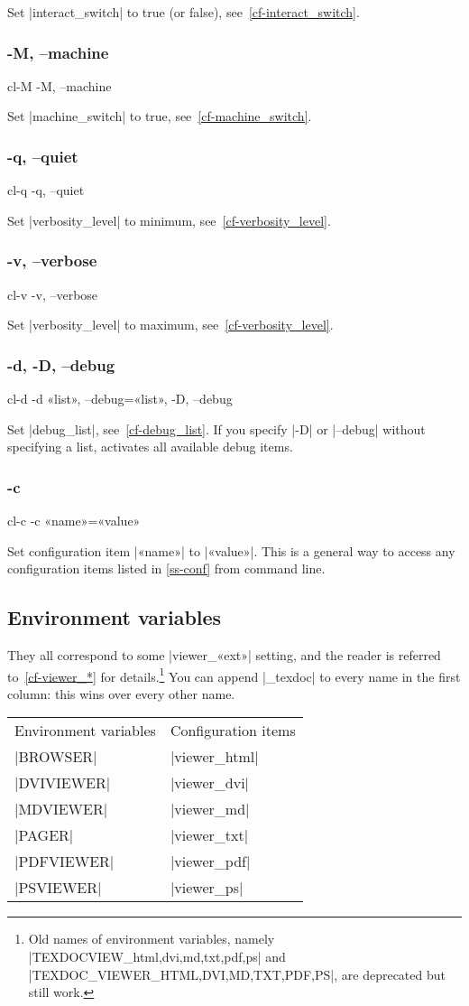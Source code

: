\documentclass[a4paper,oneside]{scrartcl}
\newif\ifframed
\newenvironment{cmdsubsub}[2]
  {\framedfalse \commandes\subsubsection{#1}{#2}}
  {\endcommandes}
\begin{document}
Set |interact_switch| to true (or false), see~\ref{cf-interact_switch}.

\begin{cmdsubsub}{-M, --machine}{cl-M}
  -M, --machine
\end{cmdsubsub}

Set |machine_switch| to true, see~\ref{cf-machine_switch}.

\begin{cmdsubsub}{-q, --quiet}{cl-q}
  -q, --quiet
\end{cmdsubsub}

Set |verbosity_level| to minimum, see~\ref{cf-verbosity_level}.

\begin{cmdsubsub}{-v, --verbose}{cl-v}
  -v, --verbose
\end{cmdsubsub}

Set |verbosity_level| to maximum, see~\ref{cf-verbosity_level}.

\begin{cmdsubsub}{-d, -D, --debug}{cl-d}
  -d «list», --debug=«list», -D, --debug
\end{cmdsubsub}

Set |debug_list|, see~\ref{cf-debug_list}. If you specify |-D| or |--debug|
without specifying a list, activates all available debug items.

\begin{cmdsubsub}{-c}{cl-c}
  -c «name»=«value»
\end{cmdsubsub}

Set configuration item |«name»| to |«value»|. This is a general way to access
any configuration items listed in \ref{ss-conf} from command line.

\subsection{Environment variables}\label{ss-envvar}

They all correspond to some |viewer_«ext»| setting, and the reader is referred
to~\ref{cf-viewer_*} for details.\footnote{Old names of environment variables,
namely |TEXDOCVIEW_{html,dvi,md,txt,pdf,ps}| and
|TEXDOC_VIEWER_{HTML,DVI,MD,TXT,PDF,PS}|, are deprecated but still work.} You can
append |_texdoc| to every name in the first column: this wins over every other
name.

\begin{center}
\begin{tabular}{ll}
Environment variables & Configuration items \\
|BROWSER|             & |viewer_html|       \\
|DVIVIEWER|           & |viewer_dvi|        \\
|MDVIEWER|            & |viewer_md|         \\
|PAGER|               & |viewer_txt|        \\
|PDFVIEWER|           & |viewer_pdf|        \\
|PSVIEWER|            & |viewer_ps|         \\
\end{tabular}
\end{center}
\end{document}

